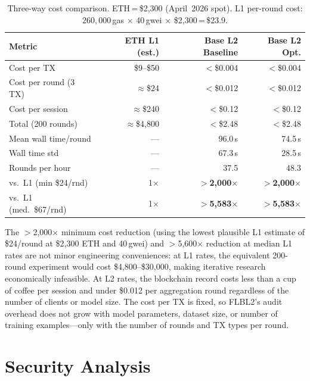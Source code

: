 \documentclass{llncs}
\begin{document}
\begin{table}[t]
\caption{Three-way cost comparison. ETH\,=\,\$2{,}300 (April~2026 spot).
  L1 per-round cost: $260{,}000$\,gas $\times$ 40\,gwei $\times$ \$2{,}300\,=\,\$23.9.}
\label{tab:costs}
\centering\footnotesize
\setlength{\tabcolsep}{3pt}
\begin{tabular}{lrrr}
\toprule
\textbf{Metric} & \textbf{ETH L1 (est.)} & \textbf{Base L2 Baseline} & \textbf{Base L2 Opt.} \\
\midrule
Cost per TX             & \$9--\$50       & $<$\$0.004    & $<$\$0.004 \\
Cost per round (3 TX)   & $\approx$\$24   & $<$\$0.012    & $<$\$0.012 \\
Cost per session        & $\approx$\$240  & $<$\$0.12     & $<$\$0.12 \\
Total (200 rounds)      & $\approx$\$4{,}800 & $<$\$2.48  & $<$\$2.48 \\
\midrule
Mean wall time/round    & ---             & 96.0\,s       & 74.5\,s \\
Wall time std           & ---             & 67.3\,s       & 28.5\,s \\
Rounds per hour         & ---             & 37.5          & 48.3 \\
\midrule
vs.\ L1 (min \$24/rnd)  & 1$\times$       & $>$\textbf{2{,}000}$\times$ & $>$\textbf{2{,}000}$\times$ \\
vs.\ L1 (med.\ \$67/rnd)& 1$\times$       & $>$\textbf{5{,}583}$\times$ & $>$\textbf{5{,}583}$\times$ \\
\bottomrule
\end{tabular}
\end{table}

The $>$2{,}000$\times$ minimum cost reduction (using the lowest plausible
L1 estimate of \$24/round at \$2{,}300 ETH and 40\,gwei) and
$>$5{,}600$\times$ reduction at median L1 rates are not minor engineering
conveniences: at L1 rates, the equivalent 200-round experiment would cost
\$4{,}800--\$30{,}000, making iterative research economically infeasible.
At L2 rates, the blockchain record costs less than a cup of coffee per
session and under \$0.012 per aggregation round regardless of the number
of clients or model size. The cost per TX is fixed, so FLBL2's audit
overhead does not grow with model parameters, dataset size, or number of
training examples---only with the number of rounds and TX types per round.


\FloatBarrier
\section{Security Analysis}
\label{sec:security}
\end{document}
